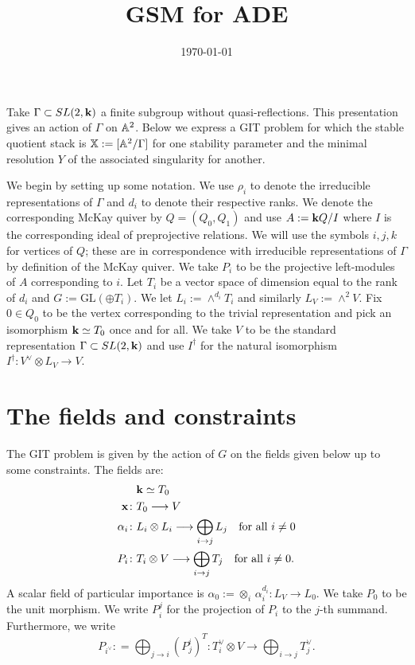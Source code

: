 \documentclass{amsart}
\title{GSM for ADE}
\date{\today}
\theoremstyle{definition}
\begin{document}
\maketitle

Take $\Gamma \subset SL(2,\mathbf{k})$ a finite subgroup without quasi-reflections.
This presentation gives an action of $\Gamma$ on $\mathbb{A}^2$.
Below we express a GIT problem for which the stable quotient stack is $\mathbb{X}:= [\mathbb{A}^2/ \Gamma]$ for one stability parameter and the minimal resolution $Y$ of the associated singularity for another.

We begin by setting up some notation.
We use $\rho_i$ to denote the irreducible representations of $\Gamma$ and $d_i$ to denote their respective ranks.
We denote the corresponding McKay quiver by $Q = (Q_0, Q_1)$ and use $A:= \mathbf{k} Q/I$ where $I$ is the corresponding ideal of preprojective relations.
We will use the symbols $i,j,k$ for vertices of $Q$; these are in correspondence with irreducible representations of $\Gamma$ by definition of the McKay quiver.
We take $P_i$ to be the projective left-modules of $A$ corresponding to $i$.
Let $T_i$ be a vector space of dimension equal to the rank of $d_i$ and $G:= \text{GL}(\oplus T_i)$.
We let $L_i:= \wedge^{d_i} T_i$ and similarly $L_V:= \wedge^2 V$.
Fix $0 \in Q_0$ to be the vertex corresponding to the trivial representation and pick an isomorphism $\mathbf{k} \simeq T_0$ once and for all.
We take $V$ to be the standard representation $\Gamma \subset SL(2,\mathbf{k})$ and use $I^\dagger$ for the natural isomorphism $I^\dagger \colon V^\vee \otimes L_V \rightarrow V$.

\section{The fields and constraints}
The GIT problem is given by the action of $G$ on the fields given below up to some constraints.
The fields are:
\begin{align}
    &\mathbf{k} \simeq T_0 \\
\mathbf{x} \colon &T_0 \longrightarrow V \label{fd:x} \\
\alpha_i \colon &L_i \otimes L_i \longrightarrow \bigoplus_{i \rightarrow j} L_j \quad \text{for all} \,\, i\neq 0 \label{fd:alpha} \\
 P_i \colon &T_i \otimes V \longrightarrow \bigoplus_{i \rightarrow j} T_j \quad \text{for all} \,\, i\neq 0. \label{fd:P}
\end{align}
A scalar field of particular importance is $\alpha_0:= \otimes_i \,\alpha_i^{d_i}: L_V \rightarrow L_0$.
We take $P_0$ to be the unit morphism.
We write $P_i^j$ for the projection of $P_i$ to the $j$-th summand. 
Furthermore, we write $$ P_{i^\vee}: = \bigoplus_{j \rightarrow i} (P_j^i)^T \colon T_i^\vee \otimes V \longrightarrow \bigoplus_{i \rightarrow j} T_j^\vee.$$
\end{document}
